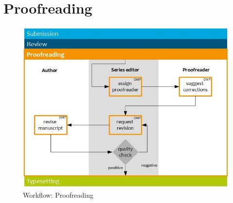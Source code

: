 


\newpage


\section{Proofreading} 

\begin{figure}[h] \centering
\includegraphics[width=1\textwidth]{./img/workflow_proofreading.jpg} \caption{Workflow: Proofreading}
\label{fig:workflowProofreading}
\end{figure}


